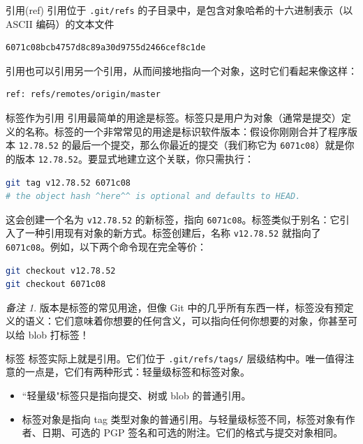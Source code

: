 \documentclass[aspectratio=169,xcolor=dvipsnames]{beamer}
\theoremstyle{remark}
\newtheorem*{remark}{备注}
\begin{document}
\begin{frame}{引用(ref)}
引用位于 \lstinline|.git/refs| 的子目录中，是包含对象哈希的十六进制表示（以 ASCII 编码）的文本文件
\begin{lstlisting}
6071c08bcb4757d8c89a30d9755d2466cef8c1de
\end{lstlisting}

引用也可以引用另一个引用，从而间接地指向一个对象，这时它们看起来像这样：
\begin{lstlisting}[language=bash]
ref: refs/remotes/origin/master
\end{lstlisting}
\end{frame}

\begin{frame}{标签作为引用}
引用最简单的用途是标签。标签只是用户为对象（通常是提交）定义的名称。标签的一个非常常见的用途是标识软件版本：假设你刚刚合并了程序版本 \lstinline|12.78.52| 的最后一个提交，那么你最近的提交（我们称它为 \lstinline|6071c08|）就是你的版本 \lstinline|12.78.52|。要显式地建立这个关联，你只需执行：
\begin{lstlisting}[language=bash]
git tag v12.78.52 6071c08
# the object hash ^here^^ is optional and defaults to HEAD.
\end{lstlisting}
这会创建一个名为 \lstinline|v12.78.52| 的新标签，指向 \lstinline|6071c08|。标签类似于别名：它引入了一种引用现有对象的新方式。标签创建后，名称 \lstinline|v12.78.52| 就指向了 \lstinline|6071c08|。例如，以下两个命令现在完全等价：
\begin{lstlisting}[language=bash]
git checkout v12.78.52
git checkout 6071c08
\end{lstlisting}
\begin{remark}
版本是标签的常见用途，但像 Git 中的几乎所有东西一样，标签没有预定义的语义：它们意味着你想要的任何含义，可以指向任何你想要的对象，你甚至可以给 blob 打标签！
\end{remark}
\end{frame}

\begin{frame}{标签}
标签实际上就是引用。它们位于 \lstinline|.git/refs/tags/| 层级结构中。唯一值得注意的一点是，它们有两种形式：轻量级标签和标签对象。
\begin{itemize}
    \item ``轻量级"标签只是指向提交、树或 blob 的普通引用。
    \item 标签对象是指向 tag 类型对象的普通引用。与轻量级标签不同，标签对象有作者、日期、可选的 PGP 签名和可选的附注。它们的格式与提交对象相同。
\end{itemize}
\end{frame}
\end{document}
